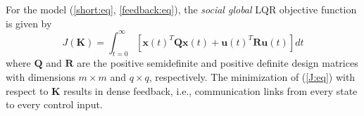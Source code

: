 \documentclass[12pt, draftclsnofoot,onecolumn]{IEEEtran}
\begin{document}
\begin{table}[!b]
\begin{tabular}{p{}p{}}
\hline
\end{tabular}
\label{notation:tb}
\end{table}



For the model (\ref{short:eq}, \ref{feedback:eq}), the {\it social global} LQR objective function is given by \cite{lewis1995optimal}
\begin{equation}
J(\boldsymbol{K})=\int_{t=0}^{\infty}{[{\boldsymbol x}(t)^T {\boldsymbol Q}{\boldsymbol x}(t)+ {\boldsymbol u}(t)^T{\boldsymbol R}{\boldsymbol u}(t) ]dt}
\label{J:eq}
\end{equation}
\noindent where ${\boldsymbol Q}$ and ${\boldsymbol R}$ are the positive semidefinite and positive definite design matrices with dimensions $m\times m$ and $q\times q$, respectively. The minimization of (\ref{J:eq}) with respect to $\boldsymbol{K}$ results in dense feedback, i.e., communication links from every state to every control input.
\end{document}
